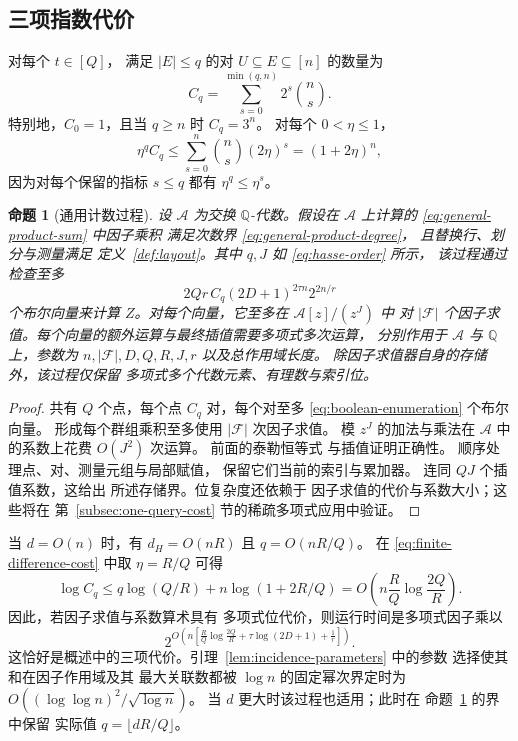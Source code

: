 \documentclass[11pt,reqno]{amsart}
\numberwithin{equation}{section}
\newtheorem{proposition}[theorem]{命题}
\theoremstyle{definition}\newtheorem{definition}[theorem]{定义}
\theoremstyle{remark}\newtheorem{remark}[theorem]{注}
\renewcommand{\le}{\leqslant}
\renewcommand{\ge}{\geqslant}
\begin{document}
\subsection{三项指数代价}
\label{subsec:three-costs}
对每个 $t\in[Q]$，
满足 $|E|\le q$ 的对 $U\subseteq E\subseteq[n]$ 的数量为
\begin{equation}\label{eq:pair-count}
 C_q=\sum_{s=0}^{\min(q,n)}2^s\binom ns.
\end{equation}
特别地，$C_0=1$，且当 $q\ge n$ 时 $C_q=3^n$。
对每个 $0<\eta\le1$，
\begin{equation}\label{eq:finite-difference-cost}
 \eta^qC_q\le\sum_{s=0}^n\binom ns(2\eta)^s=(1+2\eta)^n,
\end{equation}
因为对每个保留的指标 $s\le q$ 都有 $\eta^q\le\eta^s$。

\begin{proposition}[通用计数过程]\label{prop:general-count}
设 $\mathcal A$ 为交换 $\mathbb Q$-代数。假设在
$\mathcal A$ 上计算的 \eqref{eq:general-product-sum} 中因子乘积
满足次数界 \eqref{eq:general-product-degree}，
且替换行、划分与测量满足
定义~\ref{def:layout}。其中 $q,J$ 如 \eqref{eq:hasse-order} 所示，
该过程通过检查至多
\[
 2Qr\,C_q(2D+1)^{2\tau n}2^{2n/r}
\]
个布尔向量来计算 $Z$。对每个向量，它至多在 $\mathcal A[z]/(z^J)$ 中
对 $|\mathcal F|$ 个因子求值。每个向量的额外运算与最终插值需要多项式多次运算，
分别作用于 $\mathcal A$ 与 $\mathbb Q$ 上，参数为
$n,|\mathcal F|,D,Q,R,J,r$ 以及总作用域长度。
除因子求值器自身的存储外，该过程仅保留
多项式多个代数元素、有理数与索引位。
\end{proposition}
\begin{proof}
共有 $Q$ 个点，每个点 $C_q$ 对，每个对至多
\eqref{eq:boolean-enumeration} 个布尔向量。
形成每个群组乘积至多使用 $|\mathcal F|$ 次因子求值。
模 $z^J$ 的加法与乘法在 $\mathcal A$ 中的系数上花费 $O(J^2)$ 次运算。
前面的泰勒恒等式
与插值证明正确性。
顺序处理点、对、测量元组与局部赋值，
保留它们当前的索引与累加器。
连同 $QJ$ 个插值系数，这给出
所述存储界。位复杂度还依赖于
因子求值的代价与系数大小；这些将在
第~\ref{subsec:one-query-cost} 节的稀疏多项式应用中验证。
\end{proof}

当 $d=O(n)$ 时，有 $d_H=O(nR)$ 且 $q=O(nR/Q)$。
在 \eqref{eq:finite-difference-cost} 中取 $\eta=R/Q$ 可得
\[
 \log C_q\le q\log(Q/R)+n\log(1+2R/Q)
     =O\!\left(n\frac RQ\log\frac{2Q}{R}\right).
\]
因此，若因子求值与系数算术具有
多项式位代价，则运行时间是多项式因子乘以
\begin{equation}\label{eq:three-costs}
 2^{O\left(n\left[
       \frac RQ\log\frac{2Q}{R}
       +\tau\log(2D+1)+\frac1r\right]\right)}.
\end{equation}
这恰好是概述中的三项代价。引理~\ref{lem:incidence-parameters} 中的参数
选择使其和在因子作用域及其
最大关联数都被 $\log n$ 的固定幂次界定时为
$O((\log\log n)^2/\sqrt{\log n})$。
当 $d$ 更大时该过程也适用；此时在
命题~\ref{prop:general-count} 的界中保留
实际值 $q=\lfloor dR/Q\rfloor$。
\end{document}

